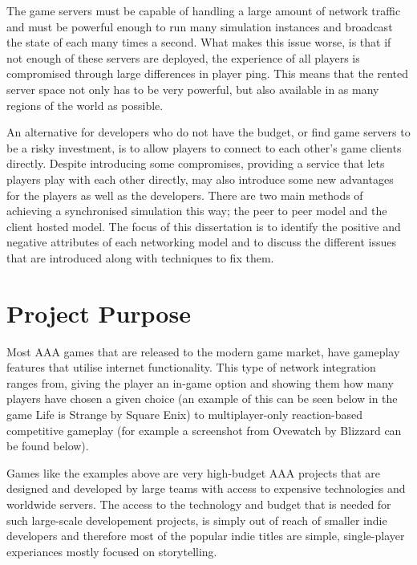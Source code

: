 The game servers must be capable of handling a large amount of network traffic and must be powerful enough to run many simulation instances and broadcast the state of each many times a second. What makes this issue worse, is that if not enough of these servers are deployed, the experience of all players is compromised through large differences in player ping. This means that the rented server space not only has to be very powerful, but also available in as many regions of the world as possible.

An alternative for developers who do not have the budget, or find game servers to be a risky investment, is to allow players to connect to each other's game clients directly. Despite introducing some compromises, providing a service that lets players play with each other directly, may also introduce some new advantages for the players as well as the developers. There are two main methods of achieving a synchronised simulation this way; the peer to peer model and the client hosted model. The focus of this dissertation is to identify the positive and negative attributes of each networking model and to discuss the different issues that are introduced along with techniques to fix them.


\section{Project Purpose}
Most AAA games that are released to the modern game market, have gameplay features that utilise internet functionality. This type of network integration ranges from, giving the player an in-game option and showing them how many players have chosen a given choice (an example of this can be seen below in the game Life is Strange by Square Enix) to multiplayer-only reaction-based competitive gameplay (for example a screenshot from Ovewatch by Blizzard can be found below).

\begin{figure}[!h]
  \centering
{}
  \qquad
\end{figure}

Games like the examples above are very high-budget AAA projects that are designed and developed by large teams with access to expensive technologies and worldwide servers. The access to the technology and budget that is needed for such large-scale developement projects, is simply out of reach of smaller indie developers and therefore most of the popular indie titles are simple, single-player experiances mostly focused on storytelling.

